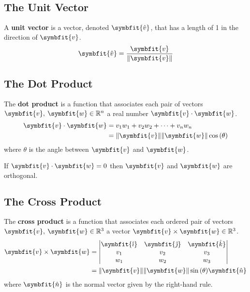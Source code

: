 \documentclass{article}
\begin{document}
\subsection{The Unit Vector}
\begin{definition}
    A \textbf{unit vector} is a vector, denoted \(\symbfit{\hat{v}}\),
    that has a length of 1 in the direction of \(\symbfit{v}\).
    \begin{equation*}
        \symbfit{\hat{v}} = \frac{\symbfit{v}}{\norm{\symbfit{v}}}
    \end{equation*}
\end{definition}
\subsection{The Dot Product}
\begin{definition}
    The \textbf{dot product} is a function that associates each pair of
    vectors \(\symbfit{v},\: \symbfit{w} \in \mathbb{R}^n\) a real
    number \(\symbfit{v}\cdot\symbfit{w}\).
    \begin{align*}
        \symbfit{v}\cdot\symbfit{w} & = v_1 w_1 + v_2 w_2 + \cdots + v_n w_n                            \\
                                    & = \norm{\symbfit{v}} \norm{\symbfit{w}} \cos{\left(\theta\right)}
    \end{align*}
    where \(\theta\) is the angle between \(\symbfit{v}\) and
    \(\symbfit{w}\).
\end{definition}
\begin{theorem}
    If \(\symbfit{v} \cdot \symbfit{w}=0\) then \(\symbfit{v}\) and
    \(\symbfit{w}\) are orthogonal.
\end{theorem}
\subsection{The Cross Product}
\begin{definition}
    The \textbf{cross product} is a function that associates each
    ordered pair of vectors
    \(\symbfit{v},\: \symbfit{w}\in \mathbb{R}^3\) a vector
    \(\symbfit{v}\times\symbfit{w}\in \mathbb{R}^3\).
    \begin{align*}
        \symbfit{v}\times\symbfit{w} & =
        \begin{vmatrix}
            \symbfit{\hat{\imath}} & \symbfit{\hat{\jmath}} & \symbfit{\hat{k}} \\
            v_1                    & v_2                    & v_3               \\
            w_1                    & w_2                    & w_3
        \end{vmatrix}          \\
                                     & = \norm{\symbfit{v}}\norm{\symbfit{w}}\sin{\left(\theta\right)}\symbfit{\hat{n}}
    \end{align*}
    where \(\symbfit{\hat{n}}\) is the normal vector given by the
    right-hand rule.
\end{definition}
\newpage
\end{document}
